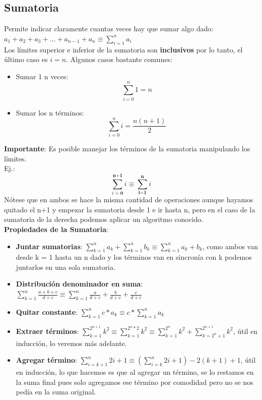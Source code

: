 \documentclass[10pt,a4paper]{article}
\begin{document}
\subsection*{Sumatoria}
Permite indicar claramente cuantas veces hay que sumar algo dado: $ a_{1} + a_{2} + a_{3} + ... + a_{n-1} + a_{n} \equiv \sum_{i=1}^{n}{a_{i}}$ \\
Los límites superior e inferior de la sumatoria son \textbf{inclusivos} por lo tanto, el último caso es $i=n$.
Algunos casos bastante comunes:
\begin{itemize}
    \item Sumar 1 n veces: \[\sum_{i=0}^{n}{1} = n\]
    \item Sumar los n términos: \[\sum_{i=0}^{n}{i} = \frac{n(n+1)}{2}\]
\end{itemize}
\textbf{Importante}: Es posible manejar los términos de la sumatoria manipulando los límites. \\
Ej.: \[\sum_{i=\textbf{0}}^{\textbf{n+1}}{i} \equiv \sum_{\textbf{i=1}}^{\textbf{n}}{i} \] 
Nótese que en ambos se hace la misma cantidad de operaciones aunque hayamos quitado el n+1 y empezar la sumatoria desde 1 e ir hasta n, pero en el caso de la sumatoria de la derecha podemos aplicar un algoritmo conocido. \\
\textbf{Propiedades de la Sumatoria}: 
\begin{itemize}
    \item \textbf{Juntar sumatorias}: $\sum_{k=1}^{n}{a_{k}} + \sum_{k=1}^{n}{b_{k}}  \equiv \sum_{k=1}^{n}{a_{k} + b_{k}} $, como ambos van desde k = 1 hasta un n dado y los términos van en sincronía con k podemos juntarlos en una sola sumatoria.
    \item \textbf{Distribución denominador en suma}: $\sum_{k=1}^{n}{\frac{a+b+c}{d+c}} \equiv \sum_{k=1}^{n}{\frac{a}{d+c} + \frac{b}{d+c} + \frac{c}{d+c}}$
    \item \textbf{Quitar constante}: $\sum_{k=1}^{n}{c \ast a_{k}} \equiv c \ast \sum_{k=1}^{n}{a_{k}}$
    \item \textbf{Extraer términos}: $\sum_{k=1}^{2^{n+1}}{k^{2}} \equiv \sum_{k=1}^{2^{n} \ast 2}{k^{2}} \equiv \sum_{k=1}^{2^{n}}{k^{2}} + \sum_{k=2^{n}+1}^{2^{n+1}}{k^{2}} $, útil en inducción, lo veremos más adelante.
    \item \textbf{Agregar término}: $\sum_{i=k+1}^{n}{2i+1} \equiv (\sum_{i=k}^{n}{2i+1}) - 2(k+1)+1$, útil en inducción, lo que hacemos es que al agregar un término, se lo restamos en la suma final pues solo agregamos ese término por comodidad pero no se nos pedía en la suma original.
\end{itemize}
\end{document}
